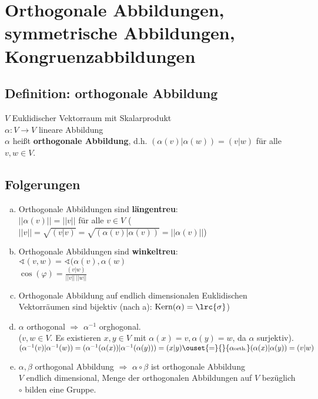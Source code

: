 \chapter{Orthogonale Abbildungen, symmetrische Abbildungen, Kongruenzabbildungen}

\section{Definition: orthogonale Abbildung}
	$ V $ Euklidischer Vektorraum mit Skalarprodukt\\
	$ \alpha:V\rightarrow V $ lineare Abbildung\\
	$ \alpha $ heißt \textbf{orthogonale Abbildung}, d.h. $ (\alpha(v)|\alpha(w))=(v|w) $ für alle $ v,w\in V $.

\section{Folgerungen}
	\begin{enumerate}[a)]
		\item Orthogonale Abbildungen sind \textbf{längentreu}:\\
		$ ||\alpha(v)||=||v|| $ für alle $ v\in V $
		($ ||v||=\sqrt{(v|v)}=\sqrt{(\alpha(v)|\alpha(v))}=||\alpha(v)|| $)
		\item  Orthogonale Abbildungen sind \textbf{winkeltreu}:\\
		$\sphericalangle(v,w)=\sphericalangle(\alpha(v),\alpha(w)$\\
		$ \cos(\varphi)=\frac{(v|w)}{||v||\ ||w|| } $
		\item Orthogonale Abbildung auf endlich dimensionalen Euklidischen Vektorräumen sind bijektiv (nach a): $ \mbox{Kern}(\alpha)=\lrc{\sigma} $)
		\item  $ \alpha $ orthogonal $ \Rightarrow $ $ \alpha^{-1} $ orghogonal.\\
		($ v,w\in V $. Es existieren $ x,y\in V $ mit $ \alpha(x)=v,\alpha(y)=w $, da $ \alpha $ surjektiv).\\
		$( \alpha^{-1}(v)|\alpha^{-1}(w) )= (\alpha^{-1}(\alpha(x))|\alpha^{-1}(\alpha(y)))=(x|y)\ouset{=}{}{\alpha\mbox{\scriptsize orth.}}(\alpha(x)|\alpha(y))=(v|w) $
		\item  $ \alpha,\beta $ orthogonal Abbildung $ \Rightarrow $ $ \alpha\circ\beta $ ist orthogonale Abbildung\\
		$ V $ endlich dimensional, Menge der orthogonalen Abbildungen auf $ V $ bezüglich $ \circ $ bilden eine Gruppe.
	\end{enumerate}

